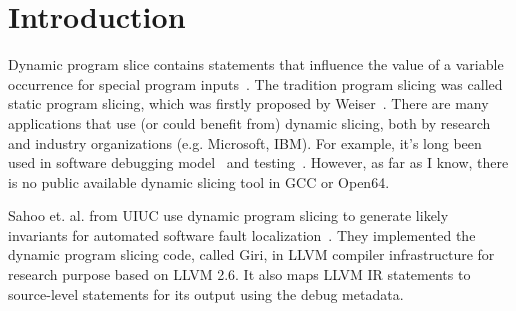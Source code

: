 \documentclass[DIV=calc, paper=a4, fontsize=11pt, twocolumn]{scrartcl}
\begin{document}
\section*{Introduction}
Dynamic program slice contains statements that influence the value of a variable occurrence for special program inputs~\cite{agrawal1990dynamic}.
The tradition program slicing was called static program slicing, which was firstly proposed by Weiser~\cite{weiser}.
There are many applications that use (or could benefit from) dynamic slicing, both by research and industry organizations (e.g. Microsoft, IBM).
For example, it's long been used in software debugging model~\cite{1993debugging,1999efficient} and testing~\cite{1993incremental}.
However, as far as I know, there is no public available dynamic slicing tool in GCC or Open64.

Sahoo et. al. from UIUC use dynamic program slicing to generate likely invariants for automated software fault localization~\cite{sahoo2013asplos}.
They implemented the dynamic program slicing code, called Giri, in LLVM compiler infrastructure for research purpose based on LLVM 2.6.
It also maps LLVM IR statements to source-level statements for its output using the debug metadata.  

\end{document}
